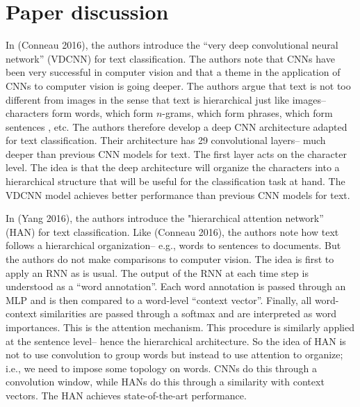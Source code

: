 \documentclass[11pt]{article}
\begin{document}
\section{Paper discussion}

In (Conneau 2016), the authors introduce the ``very deep convolutional neural network'' (VDCNN) for text classification. The authors note that CNNs have been very successful in computer vision and that a theme in the application of CNNs to computer vision is going deeper. The authors argue that text is not too different from images in the sense that text is hierarchical just like images-- characters form words, which form $n$-grams, which form phrases, which form sentences , etc. The authors therefore develop a deep CNN architecture adapted for text classification. Their architecture has 29 convolutional layers-- much deeper than previous CNN models for text. The first layer acts on the character level. The idea is that the deep architecture will organize the characters into a hierarchical structure that will be useful for the classification task at hand. The VDCNN model achieves better performance than previous CNN models for text.

In (Yang 2016), the authors introduce the "hierarchical attention network'' (HAN) for text classification. Like (Conneau 2016), the authors note how text follows a hierarchical organization-- e.g., words to sentences to documents. But the authors do not make comparisons to computer vision. The idea is first to apply an RNN as is usual. The output of the RNN at each time step is understood as a ``word annotation''. Each word annotation is passed through an MLP and is then compared to a word-level ``context vector''. Finally, all word-context similarities are passed through a softmax and are interpreted as word importances. This is the attention mechanism. This procedure is similarly applied at the sentence level-- hence the hierarchical architecture. So the idea of HAN is not to use convolution to group words but instead to use attention to organize; i.e., we need to impose some topology on words. CNNs do this through a convolution window, while HANs do this through a similarity with context vectors. The HAN achieves state-of-the-art performance.
\end{document}

